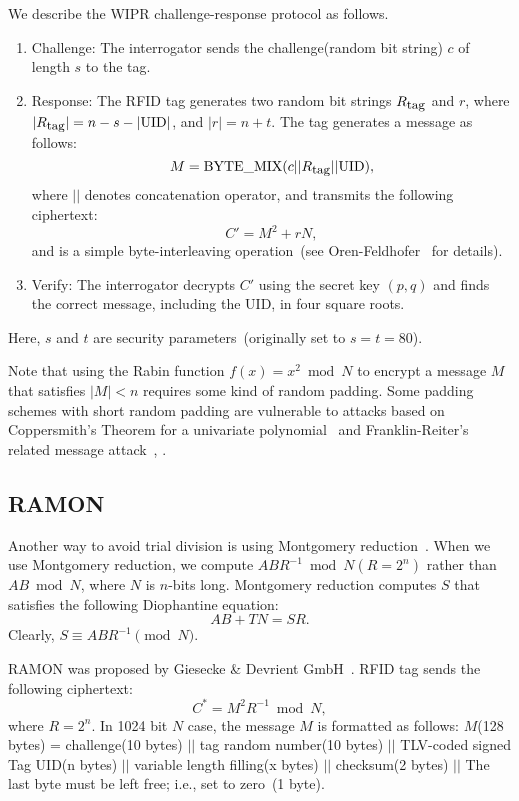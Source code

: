 \documentclass{article}
\newcommand{\BYTEMIX}{\text{\rm BYTE\_MIX}}
\begin{document}
We describe the WIPR challenge-response protocol as follows.
\begin{enumerate}
\item Challenge: The interrogator sends the challenge(random bit string) $c$ 
of length $s$ to the tag.
\item Response: 
The RFID tag generates two random bit strings $R_{\mbox{\small tag}}$ and $r$, where 
$|R_{\mbox{\small tag}}| = n - s - |\mbox{UID}|$, and $|r|=n + t$.
The tag generates a message as follows:
$$
M = \BYTEMIX(c || R_{\mbox{\small tag}} || \mbox{UID}),
$$
where $||$ denotes concatenation operator, and transmits the following ciphertext:
$$
C' = M^2 + rN, 
$$
and {\BYTEMIX} is a simple byte-interleaving 
operation~(see Oren-Feldhofer~\cite{Oren-Feldhofer2} for details).
\item Verify: The interrogator decrypts $C'$ using the secret key $(p,q)$ and 
finds the correct message, including the UID, in four square roots.
\end{enumerate}
Here, $s$ and $t$ are security parameters~(originally set to $s=t=80$).

Note that using the Rabin function $f(x)=x^2\bmod N$ to encrypt a message $M$ 
that satisfies $|M|<n$ requires 
some kind of random padding. 
Some padding schemes with short random padding are vulnerable to attacks based on 
Coppersmith's Theorem for a univariate polynomial~\cite{Coppersmith} and 
Franklin-Reiter's related message attack~\cite{FR1}, \cite{FR2}.

\subsection{RAMON}
Another way to avoid trial division is using 
Montgomery reduction~\cite{Mont}.
When we use Montgomery reduction, we 
compute $ABR^{-1} \bmod N(R=2^n)$ rather than $AB \bmod N$, 
where $N$ is $n$-bits long.
Montgomery reduction computes $S$ that satisfies the following Diophantine equation:
$$
AB + TN = SR.
$$
Clearly, $S\equiv ABR^{-1} \pmod{N}$. 

RAMON was proposed by Giesecke \& Devrient GmbH~\cite{RAMON}.
RFID tag sends the following ciphertext:
$$
C^* = M^2R^{-1}\bmod N,
$$
where $R=2^n$.
In 1024 bit $N$ case, the message $M$ is formatted as follows:
$M$(128 bytes) = challenge(10 bytes) $||$ tag random number(10 bytes)
 $||$ TLV-coded signed Tag UID(n bytes) $||$ variable length filling(x bytes) $||$ 
checksum(2 bytes) $||$ The last byte must be left free; i.e., set to zero~(1 byte).
\end{document}
